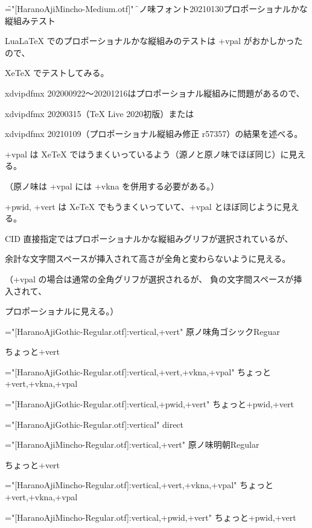 

\font\f="[HaranoAjiMincho-Medium.otf]"
\f

原ノ味フォント20210130プロポーショナルかな縦組みテスト

LuaLaTeX でのプロポーショナルかな縦組みのテストは +vpal がおかしかったので、

XeTeX でテストしてみる。

xdvipdfmx 202000922～20201216はプロポーショナル縦組みに問題があるので、

xdvipdfmx 20200315（TeX Live 2020初版）または

xdvipdfmx 20210109（プロポーショナル縦組み修正 r57357）の結果を述べる。

+vpal は XeTeX ではうまくいっているよう（源ノと原ノ味でほぼ同じ）に見える。

（原ノ味は +vpal には +vkna を併用する必要がある。）

+pwid, +vert は XeTeX でもうまくいっていて、+vpal とほぼ同じように見える。

CID 直接指定ではプロポーショナルかな縦組みグリフが選択されているが、

余計な文字間スペースが挿入されて高さが全角と変わらないように見える。

（+vpal の場合は通常の全角グリフが選択されるが、
負の文字間スペースが挿入されて、

プロポーショナルに見える。）

\font\hgr="[HaranoAjiGothic-Regular.otf]:vertical,+vert"
\hgr
原ノ味角ゴシックReguar

ちょっと+vert

\font\hgrvpal="[HaranoAjiGothic-Regular.otf]:vertical,+vert,+vkna,+vpal"
\hgrvpal
ちょっと+vert,+vkna,+vpal

\font\hgrpwidvert="[HaranoAjiGothic-Regular.otf]:vertical,+pwid,+vert"
\hgrpwidvert
ちょっと+pwid,+vert

\font\hgrdirect="[HaranoAjiGothic-Regular.otf]:vertical"
\hgrdirect
{}%
direct

\font\hmr="[HaranoAjiMincho-Regular.otf]:vertical,+vert"
\hmr
原ノ味明朝Regular

ちょっと+vert

\font\hmrvpal="[HaranoAjiMincho-Regular.otf]:vertical,+vert,+vkna,+vpal"
\hmrvpal
ちょっと+vert,+vkna,+vpal

\font\hmrpwidvert="[HaranoAjiMincho-Regular.otf]:vertical,+pwid,+vert"
\hmrpwidvert
ちょっと+pwid,+vert

